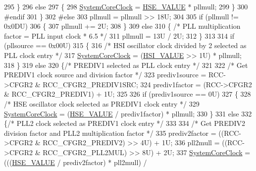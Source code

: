 \begin{DoxyCode}
295         \}
296         \textcolor{keywordflow}{else}
297         \{
298           \hyperlink{group__STM32F1xx__System__Private__Variables_gaa3cd3e43291e81e795d642b79b6088e6}{SystemCoreClock} = \hyperlink{group__STM32F1xx__System__Private__Defines_gaeafcff4f57440c60e64812dddd13e7cb}{HSE\_VALUE} * pllmull;
299         \}
300 \textcolor{preprocessor}{ #endif}
301       \}
302 \textcolor{preprocessor}{#else}
303       pllmull = pllmull >> 18U;
304       
305       \textcolor{keywordflow}{if} (pllmull != 0x0DU)
306       \{
307          pllmull += 2U;
308       \}
309       \textcolor{keywordflow}{else}
310       \{ \textcolor{comment}{/* PLL multiplication factor = PLL input clock * 6.5 */}
311         pllmull = 13U / 2U; 
312       \}
313             
314       \textcolor{keywordflow}{if} (pllsource == 0x00U)
315       \{
316         \textcolor{comment}{/* HSI oscillator clock divided by 2 selected as PLL clock entry */}
317         \hyperlink{group__STM32F1xx__System__Private__Variables_gaa3cd3e43291e81e795d642b79b6088e6}{SystemCoreClock} = (\hyperlink{group__STM32F1xx__System__Private__Defines_gaaa8c76e274d0f6dd2cefb5d0b17fbc37}{HSI\_VALUE} >> 1U) * pllmull;
318       \}
319       \textcolor{keywordflow}{else}
320       \{\textcolor{comment}{/* PREDIV1 selected as PLL clock entry */}
321         
322         \textcolor{comment}{/* Get PREDIV1 clock source and division factor */}
323         prediv1source = RCC->CFGR2 & RCC\_CFGR2\_PREDIV1SRC;
324         prediv1factor = (RCC->CFGR2 & RCC\_CFGR2\_PREDIV1) + 1U;
325         
326         \textcolor{keywordflow}{if} (prediv1source == 0U)
327         \{ 
328           \textcolor{comment}{/* HSE oscillator clock selected as PREDIV1 clock entry */}
329           \hyperlink{group__STM32F1xx__System__Private__Variables_gaa3cd3e43291e81e795d642b79b6088e6}{SystemCoreClock} = (\hyperlink{group__STM32F1xx__System__Private__Defines_gaeafcff4f57440c60e64812dddd13e7cb}{HSE\_VALUE} / prediv1factor) * pllmull;          
330         \}
331         \textcolor{keywordflow}{else}
332         \{\textcolor{comment}{/* PLL2 clock selected as PREDIV1 clock entry */}
333           
334           \textcolor{comment}{/* Get PREDIV2 division factor and PLL2 multiplication factor */}
335           prediv2factor = ((RCC->CFGR2 & RCC\_CFGR2\_PREDIV2) >> 4U) + 1U;
336           pll2mull = ((RCC->CFGR2 & RCC\_CFGR2\_PLL2MUL) >> 8U) + 2U; 
337           \hyperlink{group__STM32F1xx__System__Private__Variables_gaa3cd3e43291e81e795d642b79b6088e6}{SystemCoreClock} = (((\hyperlink{group__STM32F1xx__System__Private__Defines_gaeafcff4f57440c60e64812dddd13e7cb}{HSE\_VALUE} / prediv2factor) * pll2mull) / 

\end{DoxyCode}
